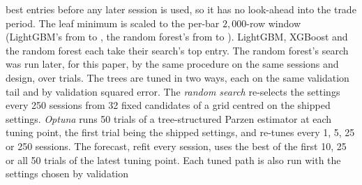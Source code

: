 best entries before any later session is used, so it has no look-ahead into the trade
period. The leaf minimum is scaled to the per-bar $2{,}000$-row window (LightGBM's from
\cmTreeProvLgbmLeafDev{} to \cmTreeProvLgbmLeaf, the random forest's from
\cmTreeProvRfLeafDev{} to \cmTreeProvRfLeaf). %
LightGBM, XGBoost and the random forest each take their search's top entry. The random
forest's search was run later, for this paper, by the same procedure on the same sessions
and design, over \cmTreeProvRfTrials{} trials. The trees are tuned in two
ways, each on the same validation tail and by validation squared error. The
\emph{random search} re-selects the settings every 250 sessions from 32 fixed
candidates of a grid centred on the shipped settings. \emph{Optuna} runs 50 trials of
a tree-structured Parzen estimator at each tuning point, the first trial being the
shipped settings, and re-tunes every 1, 5, 25 or 250 sessions.
The forecast, refit
every session, uses the best of the first 10, 25 or all 50 trials of the latest
tuning point. Each tuned path is also run with the settings chosen by validation
